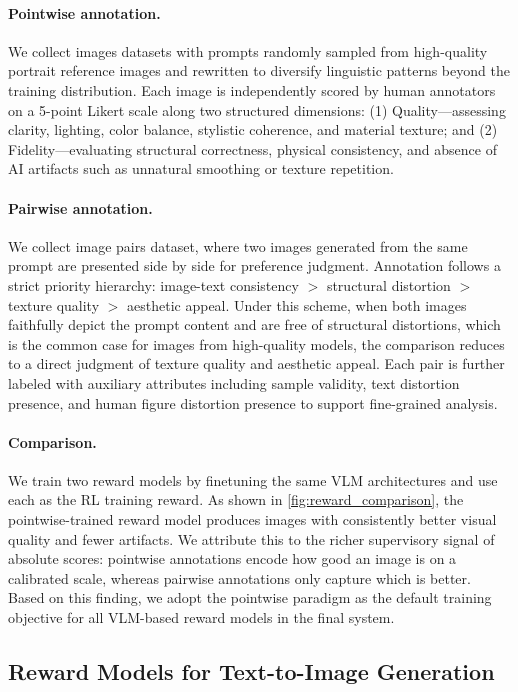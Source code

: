 \documentclass{article} %
\begin{document}
\paragraph{Pointwise annotation.} We collect images datasets with prompts randomly sampled from high-quality portrait reference images and rewritten to diversify linguistic patterns beyond the training distribution. Each image is independently scored by human annotators on a 5-point Likert scale along two structured dimensions: (1) Quality---assessing clarity, lighting, color balance, stylistic coherence, and material texture; and (2) Fidelity---evaluating structural correctness, physical consistency, and absence of AI artifacts such as unnatural smoothing or texture repetition.

\paragraph{Pairwise annotation.} We collect image pairs dataset, where two images generated from the same prompt are presented side by side for preference judgment. Annotation follows a strict priority hierarchy: image-text consistency $>$ structural distortion $>$ texture quality $>$ aesthetic appeal. Under this scheme, when both images faithfully depict the prompt content and are free of structural distortions, which is the common case for images from high-quality models, the comparison reduces to a direct judgment of texture quality and aesthetic appeal. Each pair is further labeled with auxiliary attributes including sample validity, text distortion presence, and human figure distortion presence to support fine-grained analysis.

\paragraph{Comparison.} We train two reward models by finetuning the same VLM architectures and use each as the RL training reward. As shown in \cref{fig:reward_comparison}, the pointwise-trained reward model produces images with consistently better visual quality and fewer artifacts. We attribute this to the richer supervisory signal of absolute scores: pointwise annotations encode how good an image is on a calibrated scale, whereas pairwise annotations only capture which is better. Based on this finding, we adopt the pointwise paradigm as the default training objective for all VLM-based reward models in the final system.


\subsection{Reward Models for Text-to-Image Generation}
\label{sec:reward_t2i}
\end{document}
